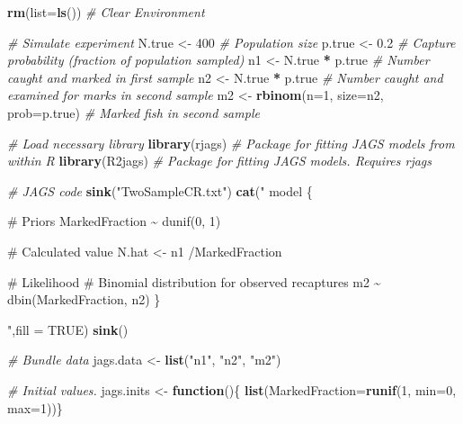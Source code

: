 \documentclass[
]{krantz}
\makeatletter
\newenvironment{Shaded}{\begin{snugshade}}{\end{snugshade}}
\newcommand{\AttributeTok}[1]{\textcolor[rgb]{0.27,0.27,0.27}{#1}}
\newcommand{\CommentTok}[1]{\textcolor[rgb]{0.37,0.37,0.37}{\textit{#1}}}
\newcommand{\ConstantTok}[1]{\textcolor[rgb]{0.37,0.37,0.37}{#1}}
\newcommand{\ControlFlowTok}[1]{\textcolor[rgb]{0.27,0.27,0.27}{\textbf{#1}}}
\newcommand{\DecValTok}[1]{\textcolor[rgb]{0.06,0.06,0.06}{#1}}
\newcommand{\FloatTok}[1]{\textcolor[rgb]{0.06,0.06,0.06}{#1}}
\newcommand{\FunctionTok}[1]{\textcolor[rgb]{0.27,0.27,0.27}{\textbf{#1}}}
\newcommand{\NormalTok}[1]{#1}
\newcommand{\OtherTok}[1]{\textcolor[rgb]{0.37,0.37,0.37}{#1}}
\newcommand{\SpecialCharTok}[1]{\textcolor[rgb]{0.43,0.43,0.43}{\textbf{#1}}}
\newcommand{\StringTok}[1]{\textcolor[rgb]{0.5,0.5,0.5}{#1}}
\newenvironment{kframe}{%
\medskip{}
\setlength{\fboxsep}{.8em}
 \def\at@end@of@kframe{}%
 \ifinner\ifhmode%
  \def\at@end@of@kframe{\end{minipage}}%
  \begin{minipage}{\columnwidth}%
 \fi\fi%
 \def\FrameCommand##1{\hskip\@totalleftmargin \hskip-\fboxsep
 \colorbox{shadecolor}{##1}\hskip-\fboxsep
     \hskip-\linewidth \hskip-\@totalleftmargin \hskip\columnwidth}%
 \MakeFramed {\advance\hsize-\width
   \@totalleftmargin\z@ \linewidth\hsize
   \@setminipage}}%
 {\par\unskip\endMakeFramed%
 \at@end@of@kframe}
\renewenvironment{Shaded}{\begin{kframe}}{\end{kframe}}
\makeatother
\begin{document}
\begin{Shaded}
\begin{Highlighting}[]
\FunctionTok{rm}\NormalTok{(}\AttributeTok{list=}\FunctionTok{ls}\NormalTok{()) }\CommentTok{\# Clear Environment}

\CommentTok{\# Simulate experiment}
\NormalTok{N.true }\OtherTok{\textless{}{-}} \DecValTok{400}  \CommentTok{\# Population size}
\NormalTok{p.true }\OtherTok{\textless{}{-}} \FloatTok{0.2} \CommentTok{\# Capture probability (fraction of population sampled)}
\NormalTok{n1 }\OtherTok{\textless{}{-}}\NormalTok{ N.true }\SpecialCharTok{*}\NormalTok{ p.true }\CommentTok{\# Number caught and marked in first sample}
\NormalTok{n2 }\OtherTok{\textless{}{-}}\NormalTok{ N.true }\SpecialCharTok{*}\NormalTok{ p.true }\CommentTok{\# Number caught and examined for marks in second sample}
\NormalTok{m2 }\OtherTok{\textless{}{-}} \FunctionTok{rbinom}\NormalTok{(}\AttributeTok{n=}\DecValTok{1}\NormalTok{, }\AttributeTok{size=}\NormalTok{n2, }\AttributeTok{prob=}\NormalTok{p.true) }\CommentTok{\# Marked fish in second sample}

\CommentTok{\# Load necessary library}
\FunctionTok{library}\NormalTok{(rjags)   }\CommentTok{\# Package for fitting JAGS models from within R}
\FunctionTok{library}\NormalTok{(R2jags)  }\CommentTok{\# Package for fitting JAGS models. Requires rjags}

\CommentTok{\# JAGS code}
\FunctionTok{sink}\NormalTok{(}\StringTok{"TwoSampleCR.txt"}\NormalTok{)}
\FunctionTok{cat}\NormalTok{(}\StringTok{"}
\StringTok{    model \{}

\StringTok{    \# Priors}
\StringTok{    MarkedFraction \textasciitilde{} dunif(0, 1)}

\StringTok{    \# Calculated value}
\StringTok{    N.hat \textless{}{-} n1 /MarkedFraction}

\StringTok{    \# Likelihood}
\StringTok{    \# Binomial distribution for observed recaptures}
\StringTok{    m2 \textasciitilde{} dbin(MarkedFraction, n2)}
\StringTok{    \}}

\StringTok{    "}\NormalTok{,}\AttributeTok{fill =} \ConstantTok{TRUE}\NormalTok{)}
\FunctionTok{sink}\NormalTok{()}

\CommentTok{\# Bundle data}
\NormalTok{jags.data }\OtherTok{\textless{}{-}} \FunctionTok{list}\NormalTok{(}\StringTok{"n1"}\NormalTok{, }\StringTok{"n2"}\NormalTok{, }\StringTok{"m2"}\NormalTok{)}

\CommentTok{\# Initial values.}
\NormalTok{jags.inits }\OtherTok{\textless{}{-}} \ControlFlowTok{function}\NormalTok{()\{ }\FunctionTok{list}\NormalTok{(}\AttributeTok{MarkedFraction=}\FunctionTok{runif}\NormalTok{(}\DecValTok{1}\NormalTok{, }\AttributeTok{min=}\DecValTok{0}\NormalTok{, }\AttributeTok{max=}\DecValTok{1}\NormalTok{))\}}


\end{Highlighting}
\end{Shaded}
\end{document}
